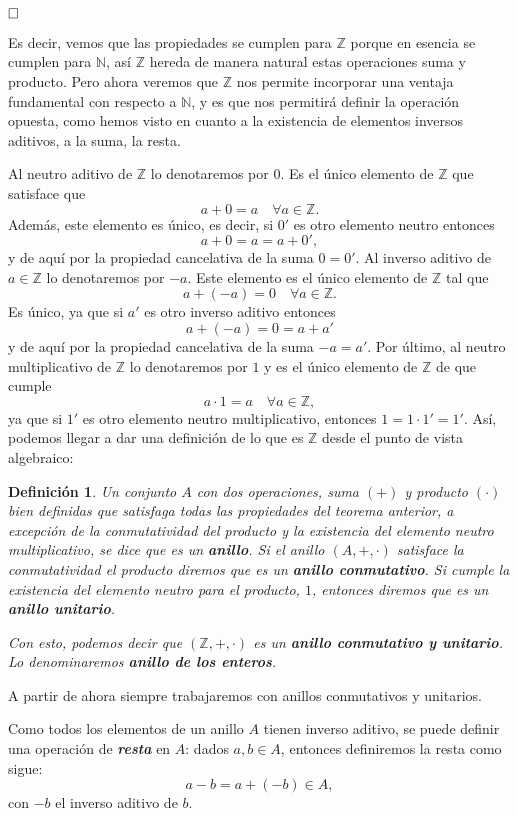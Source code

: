 \documentclass[12pt]{article}
\newtheorem{definition}[theorem]{Definición}
\begin{document}
$\hfill \square$

Es decir, vemos que las propiedades se cumplen para $\mathbb{Z}$ porque en esencia se cumplen para $\mathbb{N}$, así $\mathbb{Z}$ hereda de manera natural estas operaciones suma y producto. Pero ahora veremos que $\mathbb{Z}$ nos permite incorporar una ventaja fundamental con respecto a $\mathbb{N}$, y es que nos permitirá definir la operación opuesta, como hemos visto en cuanto a la existencia de elementos inversos aditivos, a la suma, la resta.

Al neutro aditivo de $\mathbb{Z}$ lo denotaremos por $0$. Es el único elemento de $\mathbb{Z}$ que satisface que $$a+0=a \quad \forall a \in \mathbb{Z}.$$ Además, este elemento es único, es decir, si $0'$ es otro elemento neutro entonces $$a+0 = a = a+0',$$ y de aquí por la propiedad cancelativa de la suma $0=0'$. Al inverso aditivo de $a \in \mathbb{Z}$ lo denotaremos por $-a$. Este elemento es el único elemento de $\mathbb{Z}$ tal que $$a +(-a)=0 \quad \forall a \in \mathbb{Z}.$$ Es único, ya que si $a'$ es otro inverso aditivo entonces $$a+(-a) = 0 = a+ a'$$ y de aquí por la propiedad cancelativa de la suma $-a=a'$. Por último, al neutro multiplicativo de $\mathbb{Z}$ lo denotaremos por $1$ y es el único elemento de $\mathbb{Z}$ de que cumple $$a \cdot 1 = a \quad \forall a \in \mathbb{Z},$$ ya que si $1'$ es otro elemento neutro multiplicativo, entonces $1 = 1 \cdot 1' = 1'$. Así, podemos llegar a dar una definición de lo que es $\mathbb{Z}$ desde el punto de vista algebraico:

\begin{definition}Un conjunto $A$ con dos operaciones, suma $(+)$ y producto $(\cdot)$ bien definidas que satisfaga todas las propiedades del teorema anterior, a excepción de la conmutatividad del producto y la existencia del elemento neutro multiplicativo, se dice que es un \textbf{anillo}. Si el anillo $(A, +, \cdot)$ satisface la conmutatividad el producto diremos que es un \textbf{anillo conmutativo}. Si cumple la existencia del elemento neutro para el producto, $1$, entonces diremos que es un \textbf{anillo unitario}.

Con esto, podemos decir que $(\mathbb{Z}, +, \cdot)$ es un \textbf{anillo conmutativo y unitario}. Lo denominaremos \textbf{anillo de los enteros}.
\end{definition}

A partir de ahora siempre trabajaremos con anillos conmutativos y unitarios.

Como todos los elementos de un anillo $A$ tienen inverso aditivo, se puede definir una operación de \textbf{\textit{resta}} en $A$: dados $a,b \in A$, entonces definiremos la resta como sigue: $$a-b = a+ (-b) \in A,$$ con $-b$ el inverso aditivo de $b$.
\end{document}
